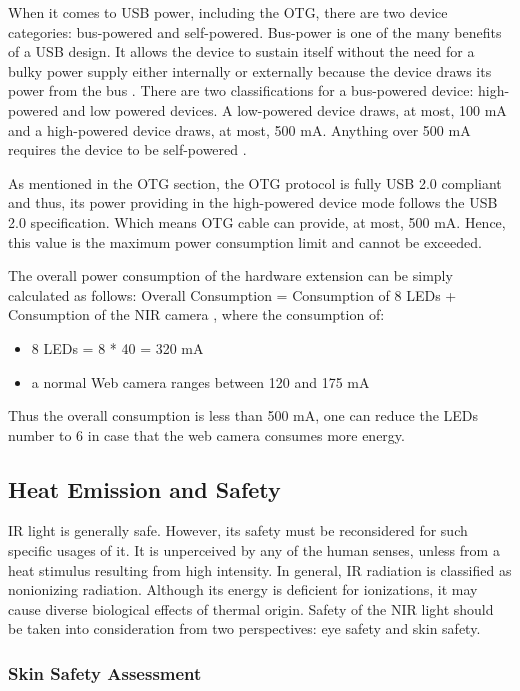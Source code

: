 When it comes to USB power, including the OTG, there are two device categories: bus-powered and self-powered. Bus-power is one of the many benefits of a USB design. It allows the device to sustain itself without the need for a bulky power supply either internally or externally because the device draws its power from the bus \parencite{usb}.
There are two classifications for a bus-powered device: high-powered and low powered devices. A low-powered device draws, at most, 100 mA and a high-powered device draws, at most, 500 mA. Anything over 500 mA requires the device to be self-powered \parencite{usb}.

As mentioned in the OTG section, the OTG protocol is fully USB 2.0 compliant and thus, its power providing in the high-powered device mode follows the USB 2.0 specification. Which means OTG cable can provide, at most, 500 mA. Hence, this value is the maximum power consumption limit and cannot be exceeded.

The overall power consumption of the hardware extension can be simply calculated as follows:	Overall Consumption = Consumption of 8 LEDs + Consumption of the NIR camera
	, where the consumption of:
\begin{itemize}
	  \item 8 LEDs = 8 * 40 = 320 mA
	  \item a normal Web camera ranges between 120 and 175 mA
\end{itemize}
Thus the overall consumption is less than 500 mA, one can reduce the LEDs number to 6 in case that the web camera consumes more energy.


\subsection{Heat Emission and Safety}
IR light is generally safe. However, its safety must be reconsidered for such specific usages of it. It is unperceived by any of the human senses, unless from a heat stimulus resulting from high intensity.
In general, IR radiation is classified as nonionizing radiation. Although its energy is deficient for ionizations, it may cause diverse biological effects of thermal origin\parencite{ledEyeSafety}.
Safety of the NIR light should be taken into consideration from two perspectives: eye safety and skin safety.
\subsubsection {Skin Safety Assessment}

